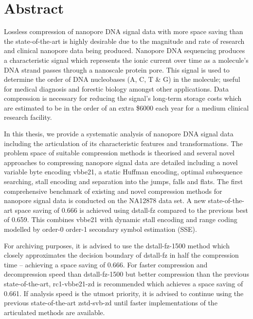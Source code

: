 \chapter*{Abstract}

Lossless compression of nanopore DNA signal data with more space saving than the
state-of-the-art is highly desirable due to the magnitude and rate of research
and clinical nanopore data being produced.
Nanopore DNA sequencing produces a characteristic signal which represents the
ionic current over time as a molecule's DNA strand passes through a nanoscale
protein pore.
This signal is used to determine the order of DNA nucleobases (A,
C, T \& G) in the molecule; useful for medical diagnosis and forestic biology
amongst other applications.
Data compression is necessary for reducing the signal's long-term storage costs
which are estimated to be in the order of an extra \$6000 each year for a medium
clinical research facility.

In this thesis, we provide a systematic analysis of nanopore DNA signal data
including the articulation of its characteristic features and transformations.
The problem space of suitable compression methods is theorised and several novel
approaches to compressing nanopore signal data are detailed including a novel
variable byte encoding vbbe21, a static Huffman encoding, optimal subsequence
searching, stall encoding and separation into the jumps, falls and flats.
The first comprehensive benchmark of existing and novel compression methods for
nanopore signal data is conducted on the NA12878 data set.
A new state-of-the-art space saving of 0.666 is achieved using dstall-fz
compared to the previous best of 0.659. This combines vbbe21 with dynamic stall
encoding and range coding modelled by order-0 order-1 secondary symbol
estimation (SSE).

For archiving purposes, it is advised to use the dstall-fz-1500 method which
closely approximates the decision boundary of dstall-fz in half the compression
time -- achieving a space saving of 0.666. For faster compression and
decompression speed than dstall-fz-1500 but better compression than the previous
state-of-the-art, rc1-vbbe21-zd is recommended which achieves a space saving of
0.661. If analysis speed is the utmost priority, it is advised to continue using
the previous state-of-the-art zstd-svb-zd until faster implementations of the
articulated methods are available.




